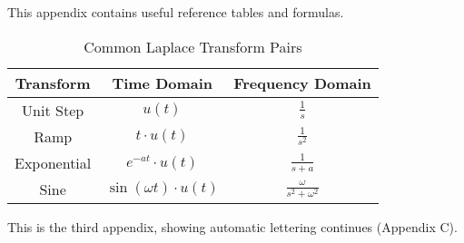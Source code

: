 \documentclass{homework}
\begin{document}
This appendix contains useful reference tables and formulas.

\begin{table}[h]
\centering
\begin{tabular}{|c|c|c|}
\hline
\textbf{Transform} & \textbf{Time Domain} & \textbf{Frequency Domain} \\
\hline
Unit Step & $u(t)$ & $\frac{1}{s}$ \\
Ramp & $t \cdot u(t)$ & $\frac{1}{s^2}$ \\
Exponential & $e^{-at} \cdot u(t)$ & $\frac{1}{s+a}$ \\
Sine & $\sin(\omega t) \cdot u(t)$ & $\frac{\omega}{s^2 + \omega^2}$ \\
\hline
\end{tabular}
\caption{Common Laplace Transform Pairs}
\end{table}

\hwappendix
This is the third appendix, showing automatic lettering continues (Appendix C).

\end{document}
